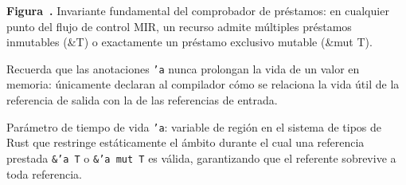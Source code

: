 \documentclass{book}
\newcounter{studiumfigure}
\begin{document}
\begin{minipage}{\linewidth}
%
\fi
\fi
\endgroup
\par\nopagebreak
{\small {}\label{fig:fig-rust-aliasing-xor-mutability}\textbf{Figura~\thestudiumfigure.} Invariante fundamental del comprobador de préstamos: en cualquier punto del flujo de control MIR, un recurso admite múltiples préstamos inmutables (\&T) o exactamente un préstamo exclusivo mutable (\&mut T).\par}
\end{minipage}
\par\vspace{\baselineskip}

\begin{tcolorbox}[title={Consejo}, studiumtip, breakable]

Recuerda que las anotaciones \texttt{'a} nunca prolongan la vida de un valor en memoria: únicamente declaran al compilador cómo se relaciona la vida útil de la referencia de salida con la de las referencias de entrada.
\end{tcolorbox}

\begin{tcolorbox}[title={Definición}, studiumdef, breakable]

Parámetro de tiempo de vida \texttt{'a}: variable de región en el sistema de tipos de Rust que restringe estáticamente el ámbito durante el cual una referencia prestada \texttt{\&'a T} o \texttt{\&'a mut T} es válida, garantizando que el referente sobrevive a toda referencia.
\end{tcolorbox}
\end{document}
